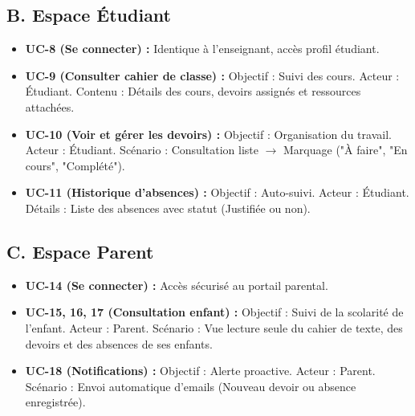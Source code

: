 \documentclass[a4paper, 11pt]{article}
\begin{document}
\subsection*{B. Espace Étudiant}
\begin{itemize}
    \item \textbf{UC-8 (Se connecter) :} Identique à l'enseignant, accès profil étudiant.
    
    \item \textbf{UC-9 (Consulter cahier de classe) :} 
    Objectif : Suivi des cours. Acteur : Étudiant.
    Contenu : Détails des cours, devoirs assignés et ressources attachées.
    
    \item \textbf{UC-10 (Voir et gérer les devoirs) :} 
    Objectif : Organisation du travail. Acteur : Étudiant.
    Scénario : Consultation liste $\rightarrow$ Marquage ("À faire", "En cours", "Complété").
    
    \item \textbf{UC-11 (Historique d'absences) :} 
    Objectif : Auto-suivi. Acteur : Étudiant.
    Détails : Liste des absences avec statut (Justifiée ou non).
\end{itemize}

\subsection*{C. Espace Parent}
\begin{itemize}
    \item \textbf{UC-14 (Se connecter) :} Accès sécurisé au portail parental.
    
    \item \textbf{UC-15, 16, 17 (Consultation enfant) :} 
    Objectif : Suivi de la scolarité de l'enfant. Acteur : Parent.
    Scénario : Vue lecture seule du cahier de texte, des devoirs et des absences de ses enfants.
    
    \item \textbf{UC-18 (Notifications) :} 
    Objectif : Alerte proactive. Acteur : Parent.
    Scénario : Envoi automatique d'emails (Nouveau devoir ou absence enregistrée).
\end{itemize}
\end{document}
